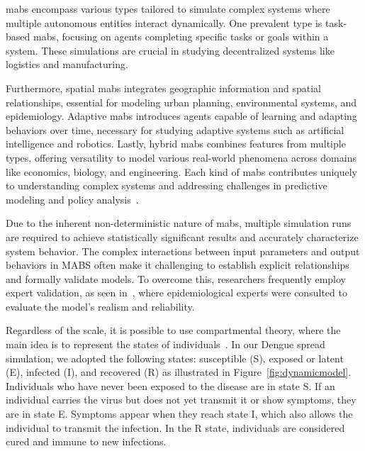 \gls{mabs} encompass various types tailored to simulate complex systems where
multiple autonomous entities interact dynamically. One prevalent type is
task-based \gls{mabs}, focusing on agents completing specific tasks or goals
within a system. These simulations are crucial in studying decentralized systems
like logistics and manufacturing.

Furthermore, spatial \gls{mabs} integrates geographic information and spatial
relationships, essential for modeling urban planning, environmental systems, and
epidemiology. Adaptive \gls{mabs} introduces agents capable of learning and
adapting behaviors over time, necessary for studying adaptive systems such as
artificial intelligence and robotics. Lastly, hybrid \gls{mabs} combines
features from multiple types, offering versatility to model various real-world
phenomena across domains like economics, biology, and engineering. Each kind of
\gls{mabs} contributes uniquely to understanding complex systems and addressing
challenges in predictive modeling and policy analysis~\citep{Bonabeau:2002}.

Due to the inherent non-deterministic nature of \gls{mabs}, multiple simulation
runs are required to achieve statistically significant results and accurately
characterize system behavior. The complex interactions between input parameters
and output behaviors in MABS often make it challenging to establish explicit
relationships and formally validate models. To overcome this, researchers
frequently employ expert validation, as seen in~\citet{amouroux:2008,
	damien:2017}, where epidemiological experts were consulted to evaluate the
model's realism and reliability.

Regardless of the scale, it is possible to use compartmental theory, where the
main idea is to represent the states of individuals~\citep{brauer-2008}. In our
Dengue spread simulation, we adopted the following states: susceptible (S),
exposed or latent (E), infected (I), and recovered (R) as illustrated in
Figure~\ref{fig:dynamicmodel}. Individuals who have never been exposed to the
disease are in state S. If an individual carries the virus but does not yet
transmit it or show symptoms, they are in state E. Symptoms appear when they
reach state I, which also allows the individual to transmit the infection. In
the R state, individuals are considered cured and immune to new infections.

